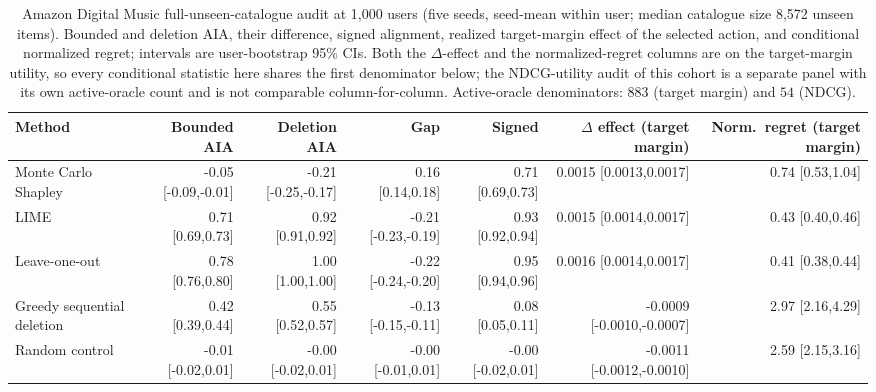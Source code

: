\begin{table}[!htbp]\centering\scriptsize\setlength{\tabcolsep}{2.5pt}
\caption{Amazon Digital Music full-unseen-catalogue audit at 1,000 users
(five seeds, seed-mean within user; median catalogue size 8,572 unseen items).
Bounded and deletion AIA, their difference, signed alignment, realized
target-margin effect of the selected action, and conditional normalized
regret; intervals are user-bootstrap 95\% CIs. Both the $\Delta$-effect and the normalized-regret columns are on the target-margin utility, so every conditional statistic here shares the first denominator below; the NDCG-utility audit of this cohort is a separate panel with its own active-oracle count and is not comparable column-for-column. Active-oracle denominators:
$883$ (target margin) and $54$ (NDCG).}
\label{tab:review5-fullcat}
\begin{tabular}{@{}lrrrrrr@{}}
\toprule
Method & Bounded AIA & Deletion AIA & Gap & Signed & $\Delta$ effect (target margin) & Norm.\ regret (target margin) \\
\midrule
Monte Carlo Shapley & -0.05 [-0.09,-0.01] & -0.21 [-0.25,-0.17] & 0.16 [0.14,0.18] & 0.71 [0.69,0.73] & 0.0015 [0.0013,0.0017] & 0.74 [0.53,1.04] \\
LIME & 0.71 [0.69,0.73] & 0.92 [0.91,0.92] & -0.21 [-0.23,-0.19] & 0.93 [0.92,0.94] & 0.0015 [0.0014,0.0017] & 0.43 [0.40,0.46] \\
Leave-one-out & 0.78 [0.76,0.80] & 1.00 [1.00,1.00] & -0.22 [-0.24,-0.20] & 0.95 [0.94,0.96] & 0.0016 [0.0014,0.0017] & 0.41 [0.38,0.44] \\
Greedy sequential deletion & 0.42 [0.39,0.44] & 0.55 [0.52,0.57] & -0.13 [-0.15,-0.11] & 0.08 [0.05,0.11] & -0.0009 [-0.0010,-0.0007] & 2.97 [2.16,4.29] \\
Random control & -0.01 [-0.02,0.01] & -0.00 [-0.02,0.01] & -0.00 [-0.01,0.01] & -0.00 [-0.02,0.01] & -0.0011 [-0.0012,-0.0010] & 2.59 [2.15,3.16] \\
\bottomrule
\end{tabular}
\end{table}
